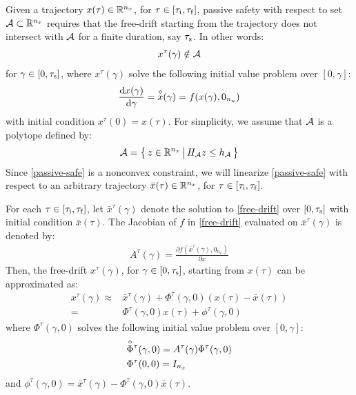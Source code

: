 \documentclass[11pt,a4paper]{article}
\begin{document}
Given a trajectory $x(\tau)\in\mathbb{R}^{n_x}$, for $\tau\in[\tau_{\mathrm{i}},\tau_{\mathrm{f}}]$, passive safety with respect to set $\mathcal{A}\subset\mathbb{R}^{n_x}$ requires that the free-drift starting from the trajectory does not intersect with $\mathcal{A}$ for a finite duration, say $\tau_{\mathrm{s}}$. In other words:
\begin{align}
    x^\tau(\gamma) \notin \mathcal{A} \label{passive-safe}
\end{align}
for $\gamma\in[0,\tau_{\mathrm{s}}]$, where $x^\tau(\gamma)$ solve the following initial value problem over $[0,\gamma]$:
\begin{align}
    \frac{\mathrm{d}x(\gamma)}{\mathrm{d}\gamma} = \overset{\diamond}{x}(\gamma) = f(x(\gamma),0_{n_u})\label{free-drift}
\end{align}
with initial condition $x^\tau(0) = x(\tau)$. For simplicity, we assume that $\mathcal{A}$ is a polytope defined by:
$$
    \mathcal{A} = \big\{\,z\in\mathbb{R}^{n_x}\,\big|\,H_{\mathcal{A}}z \le h_{\mathcal{A}}\,\big\}
$$
Since \eqref{passive-safe} is a nonconvex constraint, we will linearize \eqref{passive-safe} with respect to an arbitrary trajectory $\bar{x}(\tau)\in\mathbb{R}^{n_x}$, for $\tau\in[\tau_{\mathrm{i}},\tau_{\mathrm{f}}]$.

For each $\tau\in[\tau_{\mathrm{i}},\tau_{\mathrm{f}}]$, let $\bar{x}^\tau(\gamma)$ denote the solution to \eqref{free-drift} over $[0,\tau_{\mathrm{s}}]$ with initial condition $\bar{x}(\tau)$. The Jacobian of $f$ in \eqref{free-drift} evaluated on $\bar{x}^\tau(\gamma)$ is denoted by:
\begin{align*}
    A^\tau(\gamma) = \frac{\partial f(\bar{x}^\tau(\gamma),0_{n_u})}{\partial x}
\end{align*}
Then, the free-drift $x^\tau(\gamma)$, for $\gamma\in[0,\tau_{\mathrm{s}}]$, starting from $x(\tau)$ can be approximated as:
\begin{align*}
    x^\tau(\gamma) \approx{} & \bar{x}^\tau(\gamma) + \Phi^\tau(\gamma,0)(x(\tau) - \bar{x}(\tau))\\
    ={} & \Phi^\tau(\gamma,0)x(\tau) + \phi^\tau(\gamma,0)
\end{align*}
where $\Phi^\tau(\gamma,0)$ solves the following initial value problem over $[0,\gamma]$:
\begin{subequations}
\begin{align}
    & \overset{\diamond}{\Phi}{}^{\tau}(\gamma,0) = A^\tau(\gamma)\Phi^\tau(\gamma,0)\\
    & \Phi^\tau(0,0) = I_{n_x}
\end{align}\label{free-drift-STM}%
\end{subequations}
and $\phi^\tau(\gamma,0) = \bar{x}^\tau(\gamma) - \Phi^\tau(\gamma,0)\bar{x}(\tau)$.
\end{document}
